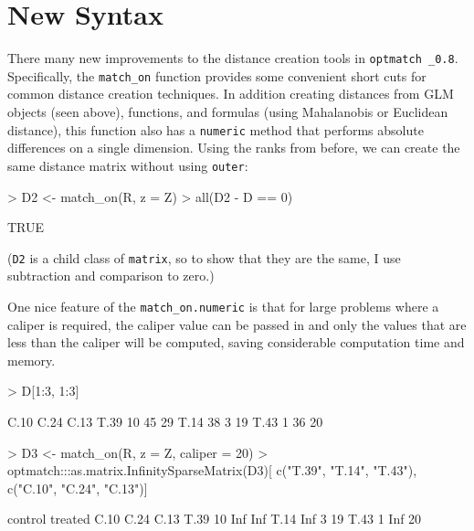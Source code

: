 \documentclass{article}
\begin{document}
\section{New Syntax}
\label{sec:new-syntax}

There many new improvements to the distance creation tools in \texttt{optmatch
\_0.8}. Specifically, the \texttt{match\_on} function provides some convenient
short cuts for common distance creation techniques. In addition creating
distances from GLM
objects (seen above), functions, and formulas (using Mahalanobis or Euclidean
distance), this function also has a \texttt{numeric} method that performs
absolute differences on a single dimension. Using the ranks from before, we can create the same
distance matrix without using \texttt{outer}:

\begin{Schunk}
\begin{Sinput}
> D2 <- match_on(R, z = Z)
> all(D2 - D == 0)
\end{Sinput}
\begin{Soutput}
[1] TRUE
\end{Soutput}
\end{Schunk}

(\texttt{D2} is a child class of \texttt{matrix}, so to show that they are the
same, I use subtraction and comparison to zero.)

One nice feature of the \texttt{match\_on.numeric} is that for large problems
where a caliper is required, the caliper value can be passed in and only the
values that are less than the caliper will be computed, saving considerable
computation time and memory.

\begin{Schunk}
\begin{Sinput}
> D[1:3, 1:3]
\end{Sinput}
\begin{Soutput}
     C.10 C.24 C.13
T.39   10   45   29
T.14   38    3   19
T.43    1   36   20
\end{Soutput}
\begin{Sinput}
> D3 <- match_on(R, z = Z, caliper = 20)
> optmatch:::as.matrix.InfinitySparseMatrix(D3)[ c("T.39", "T.14", "T.43"), c("C.10", "C.24", "C.13")]
\end{Sinput}
\begin{Soutput}
       control
treated C.10 C.24 C.13
   T.39   10  Inf  Inf
   T.14  Inf    3   19
   T.43    1  Inf   20
\end{Soutput}
\end{Schunk}
\end{document}
